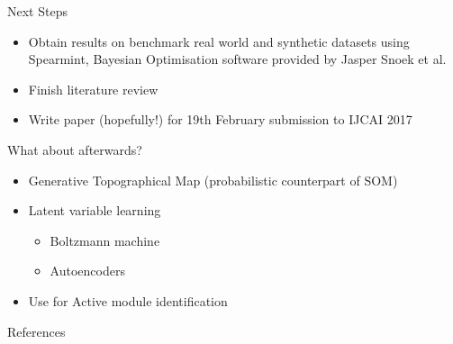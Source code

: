 \documentclass{beamer}
\begin{document}
	\begin{frame}{Next Steps}
		\begin{itemize}
			\item Obtain results on benchmark real world and synthetic datasets using Spearmint, Bayesian Optimisation software provided by Jasper Snoek et al. \cite{gelbart2014bayesian,snoek2014input,snoek2013bayesian}
			\item Finish literature review
			\item Write paper (hopefully!) for 19th February submission to IJCAI 2017 
		\end{itemize}
	\end{frame}
	
	\begin{frame}{What about afterwards?}
		\begin{itemize}
			\item Generative Topographical Map (probabilistic counterpart of SOM)
			\item Latent variable learning
			\begin{itemize}
				\item Boltzmann machine
				\item Autoencoders 
			\end{itemize}
			\item Use for Active module identification
		\end{itemize}
	\end{frame}

	\begin{frame}[allowframebreaks]{References}
		
		
	\end{frame}
\end{document}
